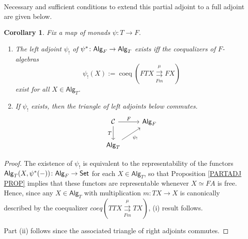 \documentclass[a4paper,10pt
,draft
]{article}%
\numberwithin{equation}{section}
\numberwithin{figure}{section}
\newtheorem{corollary}[equation]{Corollary}%
\theoremstyle{definition} %
\newtheorem{remark}[equation]{Remark}%
\newcommand{\Alg}{\mathsf{Alg}}
\newcommand{\1}{\ensuremath{\mathbbm 1}}%
\begin{document}
Necessary and sufficient conditions to extend this partial adjoint to a full adjoint are given below.
\begin{corollary}
      \label{ALGLEFTEX_COR}
      Fix a map of monads $\psi \colon T \to F$.
      \begin{enumerate}[label = (\roman*)]
      \item The left adjoint $\psi_!$ of $\psi^{\**} \colon \Alg_F \to \Alg_T$ exists iff the coequalizers of $F$-algebras
            \[
                  \psi_!(X):= \mathop{coeq}\left( FTX \overset{\mu}{\underset{Fm}{\rightrightarrows}} FX \right)
            \]
            exist for all $X \in \mathsf{Alg}_T$.
      \item If $\psi_!$ exists, then the triangle of left adjoints below commutes.
            \[
                  \begin{tikzcd}
                        \mathcal C \arrow[d, "T"'] \arrow[r, "F"]
                        &
                        \mathsf{Alg}_F
                        \\
                        \mathsf{Alg}_T \arrow[ur, "{\psi_!}"']
                  \end{tikzcd}
            \]           
      \end{enumerate}
\end{corollary}
\begin{proof}
      The existence of $\psi_!$ is equivalent to the representability of the functors 
      $\Alg_T(X,\psi^{\**}(-))\colon \Alg_{F} \to \mathsf{Set}$
      for each $X \in \Alg_T$,
      so that Proposition \ref{PARTADJ PROP} implies that these functors are representable whenever $X \simeq FA$ is free.
      Hence, since any $X \in \Alg_T$
      with multiplication $m \colon TX \to X$
      is canonically described by the coequalizer %
      $coeq \left(
            T T X 
            \overset{\mu}{\underset{Fm}{\rightrightarrows}}
            T X
      \right)$,
      (i) result follows.

      Part (ii) follows since the associated triangle of right adjoints commutes.
\end{proof}


\end{document}
